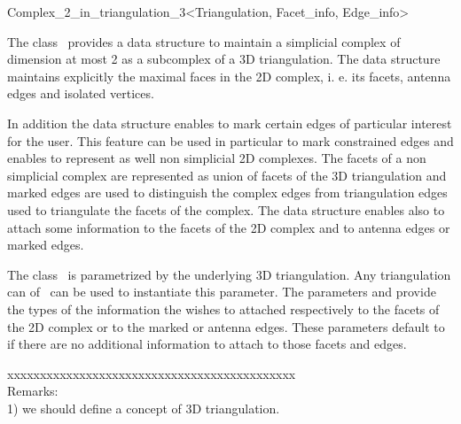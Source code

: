 

\begin{ccRefClass}{Complex_2_in_triangulation_3<Triangulation, Facet_info, Edge_info>}  



\ccDefinition
  
The class \ccRefName\ provides a data structure to maintain a 
simplicial complex of dimension at most 2
as a subcomplex of a 3D triangulation.
The data structure maintains explicitly the maximal faces
in the 2D complex, i. e. its facets, antenna edges and 
isolated vertices.

In addition the data structure enables to mark
certain edges of particular interest for the user.
This feature can be used in particular
to mark constrained edges and enables 
to represent as well non simplicial 2D complexes.
The  facets of a non simplicial  complex are 
represented as union of facets of the 3D triangulation
and marked edges are used to distinguish  the complex edges
from triangulation edges used to triangulate
the facets of the complex.
The data structure enables also to attach some information to the
facets of the 2D complex and to antenna edges or  marked edges.  


\ccParameters
The class \ccRefName\ is parametrized by the underlying
3D triangulation.
Any triangulation can of \cgal\ can be used to instantiate this parameter.
The parameters  and 
provide the types of the information the wishes to attached
respectively to the facets of the 2D complex  or to the marked
or antenna edges. These parameters default to 
if there are no additional information to attach to those facets
and edges.


xxxxxxxxxxxxxxxxxxxxxxxxxxxxxxxxxxxxxxxxxxxx \\
Remarks: \\
1)  we should define a concept of 3D triangulation. \\


\end{ccRefClass}

